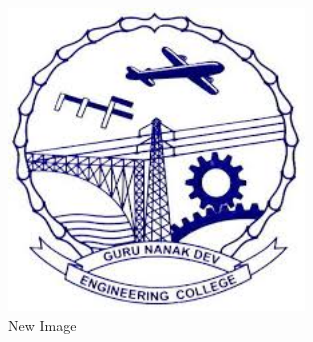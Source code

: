 \documentclass{report}
\begin{document}
\begin{figure}
\centering
\includegraphics[width=0.7\textwidth]{../../images/gnelogo}
\caption{New Image}
\label{fig:gnelogo2}
\end{figure}
\end{document}
